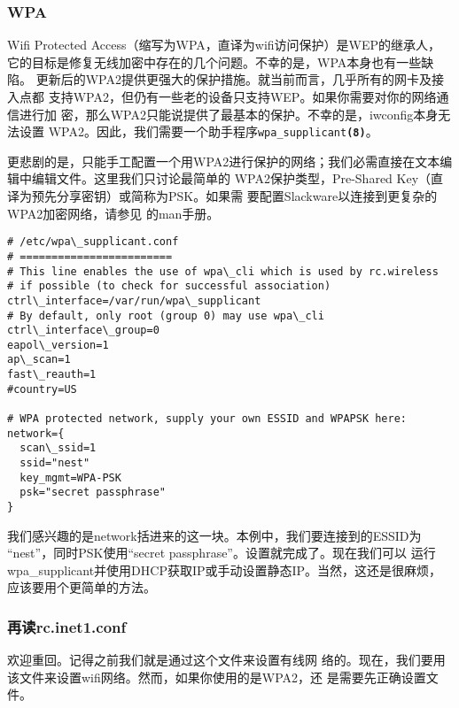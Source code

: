 \subsubsection{WPA}
\label{sec:networkConfiguration:wireless:details:wpa}
Wifi Protected Access（缩写为WPA，直译为wifi访问保护）是WEP的继承人，
它的目标是修复无线加密中存在的几个问题。不幸的是，WPA本身也有一些缺陷。
更新后的WPA2提供更强大的保护措施。就当前而言，几乎所有的网卡及接入点都
支持WPA2，但仍有一些老的设备只支持WEP。如果你需要对你的网络通信进行加
密，那么WPA2只能说提供了最基本的保护。不幸的是，iwconfig本身无法设置
WPA2。因此，我们需要一个助手程序\texttt{wpa\_supplicant\textbf{(8)}}。

更悲剧的是，只能手工配置一个用WPA2进行保护的网络；我们必需直接在文本编
辑中编辑文件。这里我们只讨论最简单的
WPA2保护类型，Pre-Shared Key（直译为预先分享密钥）或简称为PSK。如果需
要配置Slackware以连接到更复杂的WPA2加密网络，请参见
的man手册。
\begin{Verbatim}[frame=single,commandchars=\\\{\}]
# /etc/wpa\_supplicant.conf
# ========================
# This line enables the use of wpa\_cli which is used by rc.wireless
# if possible (to check for successful association)
ctrl\_interface=/var/run/wpa\_supplicant
# By default, only root (group 0) may use wpa\_cli
ctrl\_interface\_group=0
eapol\_version=1
ap\_scan=1
fast\_reauth=1
#country=US

# WPA protected network, supply your own ESSID and WPAPSK here:
network={
  scan\_ssid=1
  ssid="nest"
  key_mgmt=WPA-PSK
  psk="secret passphrase"
}
\end{Verbatim}
我们感兴趣的是network括进来的这一块。本例中，我们要连接到的ESSID为
``nest''，同时PSK使用``secret passphrase''。设置就完成了。现在我们可以
运行wpa\_supplicant并使用DHCP获取IP或手动设置静态IP。当然，这还是很麻烦，
应该要用个更简单的方法。

\subsubsection{再读rc.inet1.conf}
\label{sec:networkConfiguration:wireless:details:inet1}
欢迎重回。记得之前我们就是通过这个文件来设置有线网
络的。现在，我们要用该文件来设置wifi网络。然而，如果你使用的是WPA2，还
是需要先正确设置文件。

